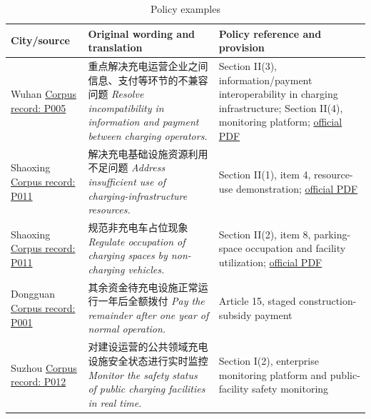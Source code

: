 \begin{table}[htbp]\centering\small
\caption{Policy examples}\label{tab:policy}
\begin{tabularx}{\linewidth}{@{}p{.16\linewidth}X p{.38\linewidth}@{}}\toprule
City/source & Original wording and translation & Policy reference and provision \\\midrule
Wuhan \citep{gov5}\newline \href{https://github.com/DS-Gao/ev-charging-service-dynamics/blob/v1.0.0/metadata/policy_sources.csv}{Corpus record: P005} & 重点解决充电运营企业之间信息、支付等环节的不兼容问题 \newline \emph{Resolve incompatibility in information and payment between charging operators.} & Section II(3), information/payment interoperability in charging infrastructure; Section II(4), monitoring platform; \href{https://www.wuhan.gov.cn/zwgk/xxgk/zfgb/202003/P020171106560912432935.pdf}{official PDF} \\
Shaoxing \citep{gov11}\newline \href{https://github.com/DS-Gao/ev-charging-service-dynamics/blob/v1.0.0/metadata/policy_sources.csv}{Corpus record: P011} & 解决充电基础设施资源利用不足问题 \newline \emph{Address insufficient use of charging-infrastructure resources.} & Section II(1), item 4, resource-use demonstration; \href{https://zjjcmspublic.oss-cn-hangzhou-zwynet-d01-a.internet.cloud.zj.gov.cn/jcms_files/jcms1/web2247/site/attach/0/feb5d86c42944dc980ae2feda02c6c79.pdf}{official PDF} \\
Shaoxing \citep{gov11}\newline \href{https://github.com/DS-Gao/ev-charging-service-dynamics/blob/v1.0.0/metadata/policy_sources.csv}{Corpus record: P011} & 规范非充电车占位现象 \newline \emph{Regulate occupation of charging spaces by non-charging vehicles.} & Section II(2), item 8, parking-space occupation and facility utilization; \href{https://zjjcmspublic.oss-cn-hangzhou-zwynet-d01-a.internet.cloud.zj.gov.cn/jcms_files/jcms1/web2247/site/attach/0/feb5d86c42944dc980ae2feda02c6c79.pdf}{official PDF} \\
Dongguan \citep{gov1}\newline \href{https://github.com/DS-Gao/ev-charging-service-dynamics/blob/v1.0.0/metadata/policy_sources.csv}{Corpus record: P001} & 其余资金待充电设施正常运行一年后全额拨付 \newline \emph{Pay the remainder after one year of normal operation.} & Article 15, staged construction-subsidy payment \\
Suzhou \citep{gov12}\newline \href{https://github.com/DS-Gao/ev-charging-service-dynamics/blob/v1.0.0/metadata/policy_sources.csv}{Corpus record: P012} & 对建设运营的公共领域充电设施安全状态进行实时监控 \newline \emph{Monitor the safety status of public charging facilities in real time.} & Section I(2), enterprise monitoring platform and public-facility safety monitoring \\
\bottomrule\end{tabularx}
\end{table}
